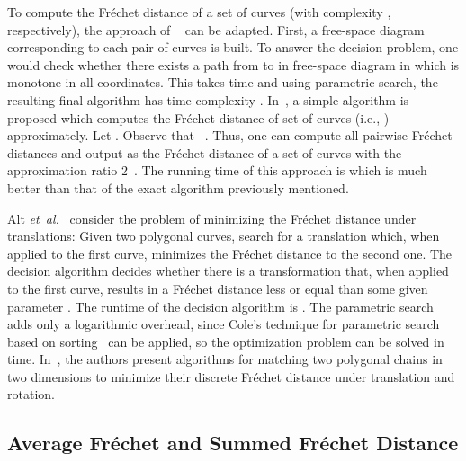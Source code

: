 \documentclass[12pt]{dalthesis}
\newcommand{\etal}{{\em et~al.\/}}
\newcommand{\Frechet}{Fr\'echet }
\begin{document}
To compute the \Frechet distance of a set of  
curves  (with complexity , respectively), 
the approach of ~\cite{AltG95} can be adapted. 
First, a free-space diagram corresponding to each pair of curves is built. 
To answer the decision problem, one would
 check whether 
there exists a path from   to  in free-space
diagram in  which is monotone in all  coordinates.
This  takes  time and  using parametric search, the resulting final algorithm
has time complexity .
In~\cite{SetofCurves}, a simple algorithm 
is proposed which computes 
the \Frechet distance of set of curves (i.e., ) approximately. 
Let . Observe that 
~\cite{SetofCurves}.
Thus, one can compute all pairwise \Frechet distances and 
output   as
the \Frechet distance of a set of curves with the approximation ratio 2~\cite{SetofCurves}. The running time of this approach is  which is much better than that of the exact algorithm previously mentioned.



Alt \etal~\cite{AltTranslation} consider the problem of 
minimizing the \Frechet distance under translations:
Given two polygonal curves, search for a translation which, when
applied to the first curve, minimizes the \Frechet distance to the second one.
The decision algorithm decides whether there is a transformation
that, when applied to the first curve, results in a \Frechet 
distance less or equal than some given parameter .
The runtime of the decision algorithm is . 
The parametric search adds only a logarithmic overhead,
since Cole's technique for parametric search based on sorting~\cite{Cole87} can be applied, so
the optimization problem can be solved in  time. 
In~\cite{JiangXZ08}, the authors present  algorithms for matching two polygonal chains 
in two dimensions to minimize their discrete \Frechet distance under 
translation and rotation.








\subsection{Average \Frechet and Summed \Frechet Distance }
\end{document}

